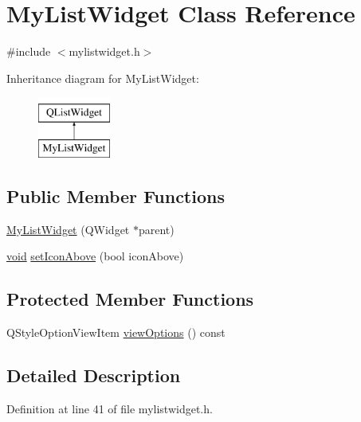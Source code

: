 \hypertarget{class_my_list_widget}{\section{My\-List\-Widget Class Reference}
\label{class_my_list_widget}
}


{\ttfamily \#include $<$mylistwidget.\-h$>$}

Inheritance diagram for My\-List\-Widget\-:\begin{figure}[H]
\begin{center}
\leavevmode
\includegraphics[height=2.000000cm]{class_my_list_widget}
\end{center}
\end{figure}
\subsection*{Public Member Functions}
\begin{DoxyCompactItemize}
\item 
\hyperlink{class_my_list_widget_a716f09f235cfdd23b37af9f5072f22da}{My\-List\-Widget} (Q\-Widget $\ast$parent)
\item 
\hyperlink{group___u_a_v_objects_plugin_ga444cf2ff3f0ecbe028adce838d373f5c}{void} \hyperlink{class_my_list_widget_a7545111a4f6b1ec1a27323b24a9da9e6}{set\-Icon\-Above} (bool icon\-Above)
\end{DoxyCompactItemize}
\subsection*{Protected Member Functions}
\begin{DoxyCompactItemize}
\item 
Q\-Style\-Option\-View\-Item \hyperlink{class_my_list_widget_a4f1903847c03fbf1317e0ecd78b1a7ea}{view\-Options} () const 
\end{DoxyCompactItemize}


\subsection{Detailed Description}


Definition at line 41 of file mylistwidget.\-h.



